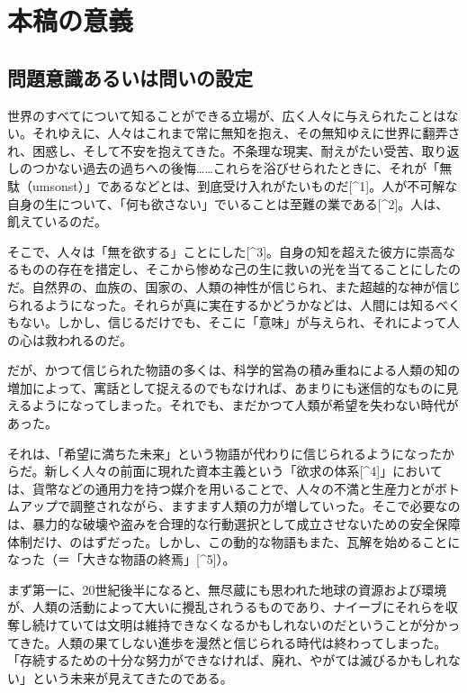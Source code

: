 \section{本稿の意義}\label{ux672cux7a3fux306eux610fux7fa9}

\subsection{問題意識あるいは問いの設定}\label{ux554fux984cux610fux8b58ux3042ux308bux3044ux306fux554fux3044ux306eux8a2dux5b9a}

世界のすべてについて知ることができる立場が、広く人々に与えられたことはない。それゆえに、人々はこれまで常に無知を抱え、その無知ゆえに世界に翻弄され、困惑し、そして不安を抱えてきた。不条理な現実、耐えがたい受苦、取り返しのつかない過去の過ちへの後悔\ldots\ldots これらを浴びせられたときに、それが「無駄（umsonst）」であるなどとは、到底受け入れがたいものだ{[}\^{}1{]}。人が不可解な自身の生について、「何も欲さない」でいることは至難の業である{[}\^{}2{]}。人は、飢えているのだ。

そこで、人々は「無を欲する」ことにした{[}\^{}3{]}。自身の知を超えた彼方に崇高なるものの存在を措定し、そこから惨めな己の生に救いの光を当てることにしたのだ。自然界の、血族の、国家の、人類の神性が信じられ、また超越的な神が信じられるようになった。それらが真に実在するかどうかなどは、人間には知るべくもない。しかし、信じるだけでも、そこに「意味」が与えられ、それによって人の心は救われるのだ。

だが、かつて信じられた物語の多くは、科学的営為の積み重ねによる人類の知の増加によって、寓話として捉えるのでもなければ、あまりにも迷信的なものに見えるようになってしまった。それでも、まだかつて人類が希望を失わない時代があった。

それは、「希望に満ちた未来」という物語が代わりに信じられるようになったからだ。新しく人々の前面に現れた資本主義という「欲求の体系{[}\^{}4{]}」においては、貨幣などの通用力を持つ媒介を用いることで、人々の不満と生産力とがボトムアップで調整されながら、ますます人類の力が増していった。そこで必要なのは、暴力的な破壊や盗みを合理的な行動選択として成立させないための安全保障体制だけ、のはずだった。しかし、この動的な物語もまた、瓦解を始めることになった（＝「大きな物語の終焉」{[}\^{}5{]}）。

まず第一に、20世紀後半になると、無尽蔵にも思われた地球の資源および環境が、人類の活動によって大いに攪乱されうるものであり、ナイーブにそれらを収奪し続けていては文明は維持できなくなるかもしれないのだということが分かってきた。人類の果てしない進歩を漫然と信じられる時代は終わってしまった。「存続するための十分な努力ができなければ、廃れ、やがては滅びるかもしれない」という未来が見えてきたのである。

